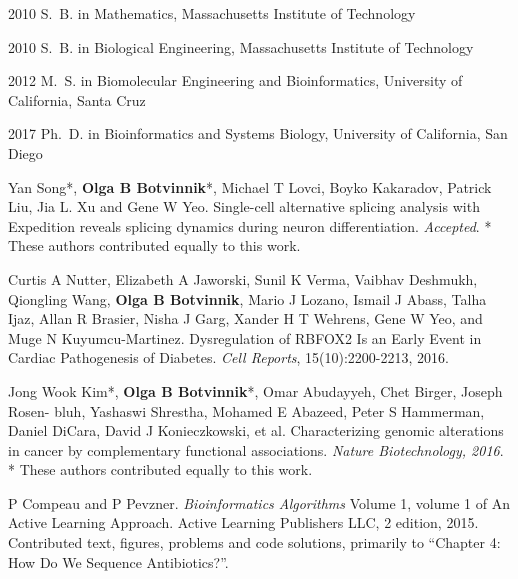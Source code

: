 \begin{frontmatter}
\begin{acknowledgements}
\end{acknowledgements}


%
%
\begin{vitapage}
\begin{vita}
  \item[2010] S.~B. in Mathematics, Massachusetts Institute of Technology
  \item[2010] S.~B. in Biological Engineering, Massachusetts Institute of Technology
  \item[2012] M.~S. in Biomolecular Engineering and Bioinformatics, University of California, Santa Cruz
  \item[2017] Ph.~D. in Bioinformatics and Systems Biology, University of California, San Diego
\end{vita}

\begin{publications}
\item Yan Song*, \textbf{Olga B Botvinnik}*, Michael T Lovci, Boyko Kakaradov, Patrick Liu, Jia L. Xu and Gene W Yeo. Single-cell alternative splicing analysis with Expedition reveals splicing dynamics during neuron differentiation. \emph{Accepted}. * These authors contributed equally to this work.

\item Curtis A Nutter, Elizabeth A Jaworski, Sunil K Verma, Vaibhav Deshmukh, Qiongling Wang, \textbf{Olga B Botvinnik}, Mario J Lozano, Ismail J Abass, Talha Ijaz, Allan R Brasier, Nisha J Garg, Xander H T Wehrens, Gene W Yeo, and Muge N Kuyumcu-Martinez. Dysregulation of RBFOX2 Is an Early Event in Cardiac Pathogenesis of Diabetes. \emph{Cell Reports}, 15(10):2200-2213, 2016.

\item Jong Wook Kim*, \textbf{Olga B Botvinnik}*, Omar Abudayyeh, Chet Birger, Joseph Rosen- bluh, Yashaswi Shrestha, Mohamed E Abazeed, Peter S Hammerman, Daniel DiCara, David J Konieczkowski, et al. Characterizing genomic alterations in cancer by complementary functional associations. \emph{Nature Biotechnology, 2016}. * These authors contributed equally to this work.

\item P Compeau and P Pevzner. \emph{Bioinformatics Algorithms} Volume 1, volume 1 of An Active Learning Approach. Active Learning Publishers LLC, 2 edition, 2015. Contributed text, figures, problems and code solutions, primarily to ``Chapter 4: How Do We Sequence Antibiotics?''.


\end{publications}
\end{vitapage}
\end{frontmatter}
